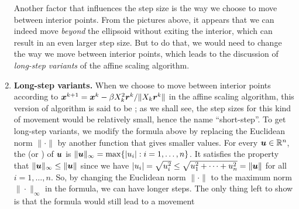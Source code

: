\begin{enumerate}
\begin{center}
\end{center}
Another factor that influences the step size is the way we choose to move
between interior points.  From the pictures above, it appears that we can
indeed move \emph{beyond} the ellipsoid without exiting the interior, which can result
in an even larger step size. But to do that, we would need to change the way we
move between interior points, which leads to the discussion of \emph{long-step
variants} of the affine scaling algorithm.
\item \textbf{Long-step variants.} When we choose to move between interior
points according to \(\bm{x}^{k+1}=\bm{x}^{k}-\beta
X_k^{2}\bm{r}^{k}/\|X_k\bm{r}^{k}\|\) in the affine scaling algorithm, this
version of algorithm is said to be ; as we shall see, the step
sizes for this kind of movement would be relatively small, hence the name
``short-step''. To get long-step variants, we modify the formula above by
replacing the Euclidean norm \(\|\cdot\|\) by another function that gives
smaller values. For every \(\bm{u}\in\mathbb{R}^{n}\), the  (or
) of \(\bm{u}\) is
\(\|\bm{u}\|_{\infty}=\max\{|u_i|:i=1,\dotsc,n\}\). It satisfies the property
that \(\|\bm{u}\|_{\infty}\le\|\bm{u}\|\) since we have
\(|u_i|=\sqrt{u_i^{2}}\le\sqrt{u_1^{2}+\dotsb+u_n^{2}}=\|\bm{u}\|\) for all
\(i=1,\dotsc,n\). So, by changing the Euclidean norm \(\|\cdot\|\) to the
maximum norm \(\|\cdot\|_{\infty}\) in the formula, we can have longer steps.
The only thing left to show is that the formula would still lead to a movement

\end{enumerate}
